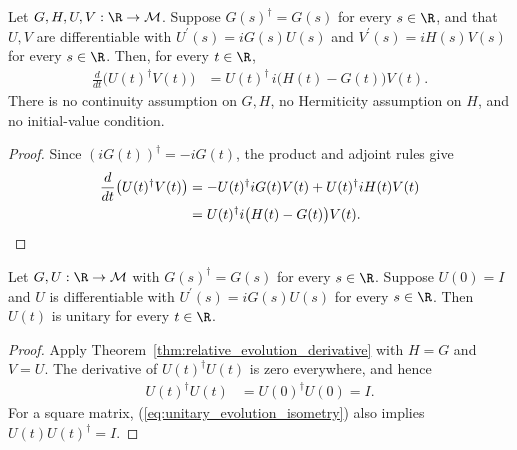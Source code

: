 \begin{theorem}
    \label{thm:relative_evolution_derivative}
    \leanok
    Let $G,H,U,V:\R\to\mathcal M$. Suppose $G(s)^\dagger=G(s)$
    for every $s\in\R$, and that $U,V$ are differentiable with
    $U^{\prime}(s)=iG(s)U(s)$ and $V^{\prime}(s)=iH(s)V(s)$ for every $s\in\R$.
    Then, for every $t\in\R$,
    \begin{align}
        \frac{d}{dt}\bigl(U(t)^\dagger V(t)\bigr)
            &=U(t)^\dagger\,i\bigl(H(t)-G(t)\bigr)V(t).
        \label{eq:unitary_evolution_relative}
    \end{align}
    There is no continuity assumption on $G,H$, no Hermiticity
    assumption on $H$, and no initial-value condition.
\end{theorem}
\begin{proof}\leanok
    Since $(iG(t))^\dagger=-iG(t)$, the product and adjoint rules give
    \begin{align}
        \frac{d}{dt}\bigl(U(t)^\dagger V(t)\bigr)
            &=-U(t)^\dagger iG(t)V(t)+U(t)^\dagger iH(t)V(t)\notag\\
            &=U(t)^\dagger i\bigl(H(t)-G(t)\bigr)V(t).\notag
    \end{align}
\end{proof}

\begin{theorem}
    \label{thm:unitary_evolution_preserved}
    \leanok
    Let $G,U:\R\to\mathcal M$ with $G(s)^\dagger=G(s)$ for every
    $s\in\R$. Suppose $U(0)=I$ and $U$ is differentiable with
    $U^{\prime}(s)=iG(s)U(s)$ for every $s\in\R$.
    Then $U(t)$ is unitary for every $t\in\R$.
\end{theorem}
\begin{proof}\leanok
    Apply Theorem~\ref{thm:relative_evolution_derivative} with $H=G$
    and $V=U$. The derivative of $U(t)^\dagger U(t)$ is zero everywhere,
    and hence
    \begin{align}
        U(t)^\dagger U(t)&=U(0)^\dagger U(0)=I.
        \label{eq:unitary_evolution_isometry}
    \end{align}
    For a square matrix, (\ref{eq:unitary_evolution_isometry}) also
    implies $U(t)U(t)^\dagger=I$.
\end{proof}

